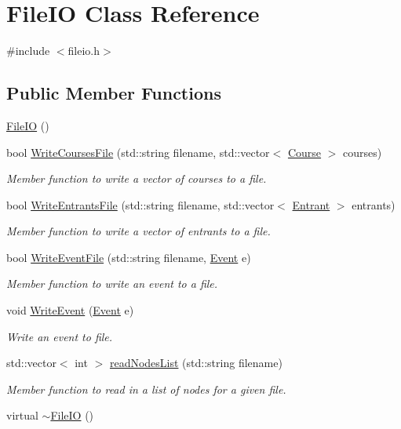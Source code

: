 \hypertarget{classFileIO}{\section{\-File\-I\-O \-Class \-Reference}
\label{classFileIO}
}


{\ttfamily \#include $<$fileio.\-h$>$}

\subsection*{\-Public \-Member \-Functions}
\begin{DoxyCompactItemize}
\item 
\hyperlink{classFileIO_a8b0d602c3461181e12c05f655dea5018}{\-File\-I\-O} ()
\item 
bool \hyperlink{classFileIO_ae08f875719305997f40dd2971feae32d}{\-Write\-Courses\-File} (std\-::string filename, std\-::vector$<$ \hyperlink{classCourse}{\-Course} $>$ courses)
\begin{DoxyCompactList}\small\item\em \-Member function to write a vector of courses to a file. \end{DoxyCompactList}\item 
bool \hyperlink{classFileIO_a6ae3512e650f4bdf7413d99856f36722}{\-Write\-Entrants\-File} (std\-::string filename, std\-::vector$<$ \hyperlink{classEntrant}{\-Entrant} $>$ entrants)
\begin{DoxyCompactList}\small\item\em \-Member function to write a vector of entrants to a file. \end{DoxyCompactList}\item 
bool \hyperlink{classFileIO_ac97971c675d1398f98fd9c0ffbb3b278}{\-Write\-Event\-File} (std\-::string filename, \hyperlink{classEvent}{\-Event} e)
\begin{DoxyCompactList}\small\item\em \-Member function to write an event to a file. \end{DoxyCompactList}\item 
void \hyperlink{classFileIO_a5dd25c0348cbb2de0a8b5ad8849362ab}{\-Write\-Event} (\hyperlink{classEvent}{\-Event} e)
\begin{DoxyCompactList}\small\item\em \-Write an event to file. \end{DoxyCompactList}\item 
std\-::vector$<$ int $>$ \hyperlink{classFileIO_a2307b9dbc55e0385337544c856ee16eb}{read\-Nodes\-List} (std\-::string filename)
\begin{DoxyCompactList}\small\item\em \-Member function to read in a list of nodes for a given file. \end{DoxyCompactList}\item 
virtual \hyperlink{classFileIO_adc3caa8f1e5d76274d8ffb8b5c17288b}{$\sim$\-File\-I\-O} ()
\end{DoxyCompactItemize}
